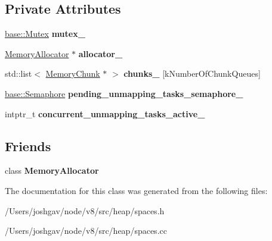 \subsection*{Private Attributes}
\begin{DoxyCompactItemize}
\item 
\hyperlink{classv8_1_1base_1_1_mutex}{base\+::\+Mutex} {\bfseries mutex\+\_\+}\hypertarget{classv8_1_1internal_1_1_memory_allocator_1_1_unmapper_aea26cb7c64b00d5d2fc8a144d15f3403}{}\label{classv8_1_1internal_1_1_memory_allocator_1_1_unmapper_aea26cb7c64b00d5d2fc8a144d15f3403}

\item 
\hyperlink{classv8_1_1internal_1_1_memory_allocator}{Memory\+Allocator} $\ast$ {\bfseries allocator\+\_\+}\hypertarget{classv8_1_1internal_1_1_memory_allocator_1_1_unmapper_aedeb274b5244c3f8bd71b3e665fee296}{}\label{classv8_1_1internal_1_1_memory_allocator_1_1_unmapper_aedeb274b5244c3f8bd71b3e665fee296}

\item 
std\+::list$<$ \hyperlink{classv8_1_1internal_1_1_memory_chunk}{Memory\+Chunk} $\ast$ $>$ {\bfseries chunks\+\_\+} \mbox{[}k\+Number\+Of\+Chunk\+Queues\mbox{]}\hypertarget{classv8_1_1internal_1_1_memory_allocator_1_1_unmapper_a05e01a1a13eb68cb4d5594e674f70f47}{}\label{classv8_1_1internal_1_1_memory_allocator_1_1_unmapper_a05e01a1a13eb68cb4d5594e674f70f47}

\item 
\hyperlink{classv8_1_1base_1_1_semaphore}{base\+::\+Semaphore} {\bfseries pending\+\_\+unmapping\+\_\+tasks\+\_\+semaphore\+\_\+}\hypertarget{classv8_1_1internal_1_1_memory_allocator_1_1_unmapper_a637bec50fda0619bb8527956164ea970}{}\label{classv8_1_1internal_1_1_memory_allocator_1_1_unmapper_a637bec50fda0619bb8527956164ea970}

\item 
intptr\+\_\+t {\bfseries concurrent\+\_\+unmapping\+\_\+tasks\+\_\+active\+\_\+}\hypertarget{classv8_1_1internal_1_1_memory_allocator_1_1_unmapper_a00d00c234082c80b33d1a886333a82c1}{}\label{classv8_1_1internal_1_1_memory_allocator_1_1_unmapper_a00d00c234082c80b33d1a886333a82c1}

\end{DoxyCompactItemize}
\subsection*{Friends}
\begin{DoxyCompactItemize}
\item 
class {\bfseries Memory\+Allocator}\hypertarget{classv8_1_1internal_1_1_memory_allocator_1_1_unmapper_aea1126d5a764b0d074d2d6edb5a09f23}{}\label{classv8_1_1internal_1_1_memory_allocator_1_1_unmapper_aea1126d5a764b0d074d2d6edb5a09f23}

\end{DoxyCompactItemize}


The documentation for this class was generated from the following files\+:\begin{DoxyCompactItemize}
\item 
/\+Users/joshgav/node/v8/src/heap/spaces.\+h\item 
/\+Users/joshgav/node/v8/src/heap/spaces.\+cc\end{DoxyCompactItemize}
